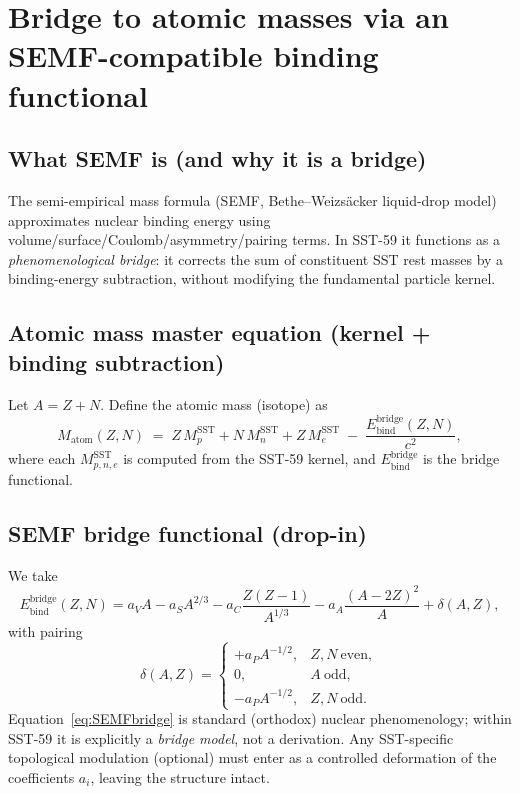\documentclass[11pt, a4paper]{article}
\begin{document}
\section{Bridge to atomic masses via an SEMF-compatible binding functional}\label{sec:semf}
\subsection{What SEMF is (and why it is a bridge)}
The semi-empirical mass formula (SEMF, Bethe--Weizs\"acker liquid-drop model) approximates nuclear binding energy using volume/surface/Coulomb/asymmetry/pairing
terms.  In SST-59 it functions as a \emph{phenomenological bridge}: it corrects the sum of constituent SST rest masses by a binding-energy subtraction,
without modifying the fundamental particle kernel.

\subsection{Atomic mass master equation (kernel + binding subtraction)}
Let \(A=Z+N\).  Define the atomic mass (isotope) as
\begin{equation}
M_{\mathrm{atom}}(Z,N)\;=\; Z\,M_p^{\mathrm{SST}} + N\,M_n^{\mathrm{SST}} + Z\,M_e^{\mathrm{SST}}
\;-\;\frac{E_{\mathrm{bind}}^{\mathrm{bridge}}(Z,N)}{c^2},
\label{eq:MatomBridge}
\end{equation}
where each \(M_{p,n,e}^{\mathrm{SST}}\) is computed from the SST-59 kernel, and \(E_{\mathrm{bind}}^{\mathrm{bridge}}\) is the bridge functional.

\subsection{SEMF bridge functional (drop-in)}
We take
\begin{equation}
E_{\mathrm{bind}}^{\mathrm{bridge}}(Z,N)
= a_V A - a_S A^{2/3} - a_C \frac{Z(Z-1)}{A^{1/3}} - a_A\frac{(A-2Z)^2}{A} + \delta(A,Z),
\label{eq:SEMFbridge}
\end{equation}
with pairing
\[
\delta(A,Z)=
\begin{cases}
 +a_P A^{-1/2},& Z,N\ \text{even},\\
 0,& A\ \text{odd},\\
 -a_P A^{-1/2},& Z,N\ \text{odd}.
\end{cases}
\]
Equation~\eqref{eq:SEMFbridge} is standard (orthodox) nuclear phenomenology; within SST-59 it is explicitly a \emph{bridge model}, not a derivation.
Any SST-specific topological modulation (optional) must enter as a controlled deformation of the coefficients \(a_i\), leaving the structure intact.
\end{document}

